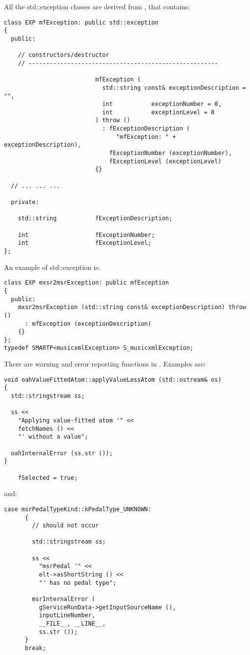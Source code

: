 All the std::exception classes are derived from {\tt }, that contains:
\begin{lstlisting}[language=CPlusPlus]
class EXP mfException: public std::exception
{
  public:

    // constructors/destructor
    // ------------------------------------------------------

                          mfException (
                            std::string const& exceptionDescription = "",
                            int           exceptionNumber = 0,
                            int           exceptionLevel = 0
                          ) throw ()
                            : fExceptionDescription (
                                "mfException: " + exceptionDescription),
                              fExceptionNumber (exceptionNumber),
                              fExceptionLevel (exceptionLevel)
                          {}

  // ... ... ...

  private:

    std::string           fExceptionDescription;

    int                   fExceptionNumber;
    int                   fExceptionLevel;
};
\end{lstlisting}

An example of std::exception is:
\begin{lstlisting}[language=CPlusPlus]
class EXP mxsr2msrException: public mfException
{
  public:
    mxsr2msrException (std::string const& exceptionDescription) throw ()
      : mfException (exceptionDescription)
    {}
};
typedef SMARTP<musicxmlException> S_musicxmlException;
\end{lstlisting}

There are warning and error reporting functions in .
Examples are:
\begin{lstlisting}[language=CPlusPlus]
void oahValueFittedAtom::applyValueLessAtom (std::ostream& os)
{
  std::stringstream ss;

  ss <<
    "Applying value-fitted atom '" <<
    fetchNames () <<
    "' without a value";

  oahInternalError (ss.str ());
}

	fSelected = true;
\end{lstlisting}

and:
\begin{lstlisting}[language=CPlusPlus]
    case msrPedalTypeKind::kPedalType_UNKNOWN:
      {
        // should not occur

        std::stringstream ss;

        ss <<
          "msrPedal '" <<
          elt->asShortString () <<
          "' has no pedal type";

        msrInternalError (
          gServiceRunData->getInputSourceName (),
          inputLineNumber,
          __FILE__, __LINE__,
          ss.str ());
      }
      break;
\end{lstlisting}

